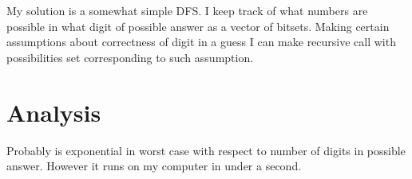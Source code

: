 \documentclass[11pt]{article}
\begin{document}
My solution is a somewhat simple DFS.  I keep track of what numbers are possible in what digit of possible answer as a vector of bitsets.  Making certain assumptions about correctness of digit in a guess I can make recursive call with possibilities set corresponding to such assumption. 

\section{Analysis}

Probably is exponential in worst case with respect to number of digits in possible answer.  However it runs on my computer in under a second.



\end{document}
